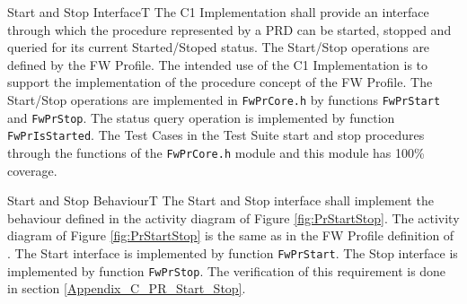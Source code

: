 \documentclass[a4paper,10pt]{article}
\newenvironment{fw_req}[6]
{\addtocounter{subsubsection}{1}
	\hspace{0.2cm}\textbf{FW-\arabic{section}.\arabic{subsection}.\arabic{subsubsection}/#2
	\hspace{0.8cm} #1}
	\vspace{-10pt}
\begin{longtable}{p{2.7cm}P{8.5cm}}
\hline
\textsc{Requirement} & #3 \\
\textsc{Justification} & #4 \\
\textsc{Implementation} & #5  \\ 
\textsc{Verification} & #6  \\
\hline
}
{\end{longtable}}
\begin{document}
\begin{fw_req}{Start and Stop Interface}{T}
{ The C1 Implementation shall provide an interface through which the 
procedure represented by a PRD can be started, stopped and queried for its current Started/Stoped status.}
{The Start/Stop operations are defined by the FW Profile. 
The intended use of the C1 Implementation is to support the implementation of the procedure 
concept of the FW Profile.}
{The Start/Stop operations are implemented in \texttt{FwPrCore.h} by 
functions \texttt{FwPrStart} and \texttt{FwPrStop}. 
The status query operation is implemented by function \texttt{FwPrIsStarted}.} 
{The Test Cases in the Test Suite start and stop procedures through the 
functions of the \texttt{FwPrCore.h} module and this module has 100\% coverage.}
\end{fw_req}


\begin{fw_req}{Start and Stop Behaviour}{T}
{The Start and Stop interface shall implement the behaviour defined in the 
activity diagram of Figure \ref{fig:PrStartStop}.}
{The activity diagram of Figure \ref{fig:PrStartStop} is the same as in 
the FW Profile definition of \cite{ref:fwprofile}.}
{The Start interface is implemented by function \texttt{FwPrStart}.
The Stop interface is implemented by function \texttt{FwPrStop}.} 
{The verification of this requirement is done in section \ref{Appendix_C_PR_Start_Stop}.}
\end{fw_req}
\end{document}
